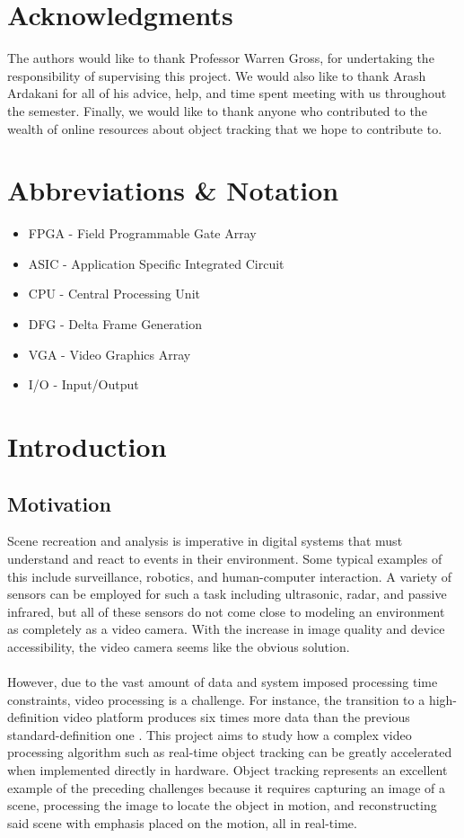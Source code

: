 \documentclass[12pt]{article} %
\begin{document}
\section*{Acknowledgments}
The authors would like to thank Professor Warren Gross, for undertaking the responsibility of supervising this project. We would also like to thank Arash Ardakani for all of his advice, help, and time spent meeting with us throughout the semester. Finally, we would like to thank anyone who contributed to the wealth of online resources about object tracking that we hope to contribute to.
\pagebreak
\tableofcontents
\pagebreak
\section{Abbreviations \& Notation}
\begin{itemize}
\item[] FPGA - Field Programmable Gate Array
\item[] ASIC - Application Specific Integrated Circuit
\item[] CPU - Central Processing Unit
\item[] DFG - Delta Frame Generation
\item[] VGA - Video Graphics Array
\item[] I/O - Input/Output
\end{itemize}
\section{Introduction}
\subsection{Motivation}
Scene recreation and analysis is imperative in digital systems that must understand and react to events in their environment. Some typical examples of this include surveillance, robotics, and human-computer interaction. A variety of sensors can be employed for such a task including ultrasonic, radar, and passive infrared, but all of these sensors do not come close to modeling an environment as completely as a video camera. With the increase in image quality and device accessibility, the video camera seems like the obvious solution. \\\\
However, due to the vast amount of data and system imposed processing time constraints, video processing is a challenge. For instance, the transition to a high-definition video platform produces six times more data than the previous standard-definition one \cite{3}. This project aims to study how a complex video processing algorithm such as real-time object tracking can be greatly accelerated when implemented directly in hardware. Object tracking represents an excellent example of the preceding challenges because it requires capturing an image of a scene, processing the image to locate the object in motion, and reconstructing said scene with emphasis placed on the motion, all in real-time.
\end{document}
